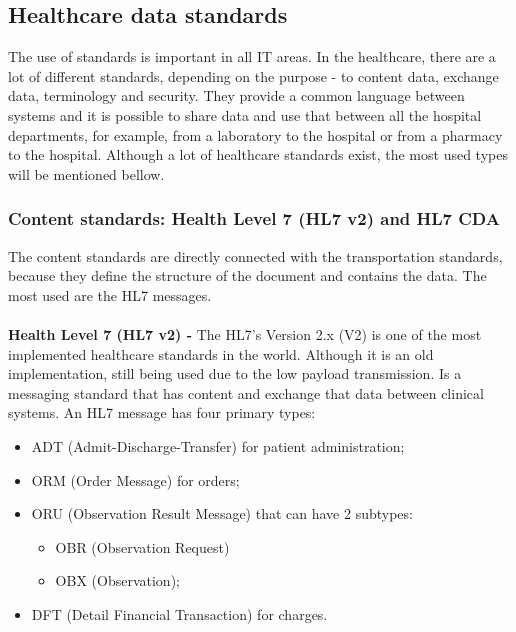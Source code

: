\documentclass[mim_thesis.tex]{subfiles}
\begin{document}
\subsection{Healthcare data standards}
The use of standards is important in all IT areas. In the healthcare, there are a lot of different standards, depending on the purpose - to content data, exchange data, terminology and security. They provide a common language between systems and it is possible to share data and use that between all the hospital departments, for example, from a laboratory to the hospital or from a pharmacy to the hospital. Although a lot of healthcare standards exist, the most used types will be mentioned bellow. 

\subsubsection{Content standards: Health Level 7 (HL7 v2) and HL7 CDA }
The content standards are directly connected with the transportation standards, because they define the structure of the document and contains the data. The most used are the HL7 messages.


\paragraph{}\textbf{Health Level 7 (HL7 v2) -}
The HL7’s Version 2.x (V2) is one of the most implemented healthcare standards in the world. Although it is an old implementation, still being used due to the low payload transmission. Is a messaging standard that has content and exchange that data between clinical systems. An HL7 message has four primary types: 

\begin{itemize}[noitemsep]
\item ADT (Admit-Discharge-Transfer) for patient administration;
\item ORM (Order Message) for orders;
\item ORU (Observation Result Message) that can have 2 subtypes: 
\begin{itemize}[noitemsep]
\item OBR (Observation Request)
\item OBX (Observation);
\end{itemize}
\item DFT (Detail Financial Transaction) for charges.
\end{itemize}
\end{document}
